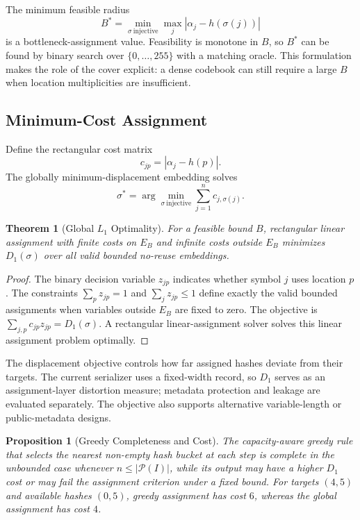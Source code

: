 \documentclass[preprint,12pt]{elsarticle}
\theoremstyle{plain}
\newtheorem{theorem}{Theorem}
\newtheorem{proposition}{Proposition}
\begin{document}
The minimum feasible radius
\begin{equation}
    B^*=\min_{\sigma\ \mathrm{injective}}\max_j
    |\alpha_j-h(\sigma(j))|
\end{equation}
is a bottleneck-assignment value. Feasibility is monotone in $B$, so $B^*$ can
be found by binary search over $\{0,\ldots,255\}$ with a matching oracle. This
formulation makes the role of the cover explicit: a dense codebook can still
require a large $B$ when location multiplicities are insufficient.

\subsection{Minimum-Cost Assignment}

Define the rectangular cost matrix
\begin{equation}
    c_{jp}=|\alpha_j-h(p)|.
\end{equation}
The globally minimum-displacement embedding solves
\begin{equation}
    \sigma^*=\arg\min_{\sigma\ \mathrm{injective}}
    \sum_{j=1}^{n}c_{j,\sigma(j)}.
\end{equation}

\begin{theorem}[Global $L_1$ Optimality]
\label{thm:assignment_optimality}
For a feasible bound $B$, rectangular linear assignment with finite costs on
$E_B$ and infinite costs outside $E_B$ minimizes $D_1(\sigma)$ over all valid
bounded no-reuse embeddings.
\end{theorem}
\begin{proof}
The binary decision variable $z_{jp}$ indicates whether symbol $j$ uses
location $p$. The constraints
$\sum_p z_{jp}=1$ and $\sum_j z_{jp}\leq1$ define exactly the valid bounded
assignments when variables outside $E_B$ are fixed to zero. The objective is
$\sum_{j,p}c_{jp}z_{jp}=D_1(\sigma)$. A rectangular linear-assignment solver solves this
linear assignment problem optimally.
\end{proof}

The displacement objective controls how far assigned hashes deviate from their
targets. The current serializer uses a fixed-width record, so $D_1$ serves as
an assignment-layer distortion measure; metadata protection and leakage are
evaluated separately. The objective also supports alternative variable-length
or public-metadata designs.

\begin{proposition}[Greedy Completeness and Cost]
The capacity-aware greedy rule that selects the nearest non-empty hash bucket
at each step is complete in the unbounded case whenever
$n\leq|\mathcal{P}(I)|$, while its output may have a higher $D_1$ cost or may fail the
assignment criterion under a fixed bound. For targets $(4,5)$ and available hashes $(0,5)$, greedy
assignment has cost $6$, whereas the global assignment has cost $4$.
\end{proposition}
\end{document}
